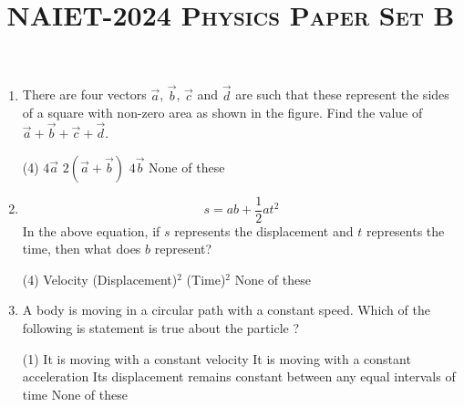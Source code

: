 \documentclass{article}
\title{\textsc{NAIET-2024 Physics Paper Set B}}
\date{}
\renewcommand{\ans}{\quad}
\begin{document}
\maketitle
\begin{enumerate}
    \item There are four vectors $\vec{a}$, $\vec{b}$, $\vec{c}$ and $\vec{d}$ are such that these represent the sides of a square with non-zero area as shown in the figure. Find the value of $\vec{a}+\vec{b}+\vec{c}+\vec{d}$.
        \begin{center}
        \end{center}
        \begin{tasks}(4)
            \task $4\vec{a}$
            \task $2\left(\vec{a}+\vec{b}\right)$
            \task $4\vec{b}$
            \task None of these \ans
        \end{tasks}

    \item \[ s = ab + \dfrac{1}{2}at^2 \]
        In the above equation, if $s$ represents the displacement and $t$ represents the time, then what does $b$ represent?
        \begin{tasks}(4)
            \task Velocity
            \task (Displacement)$^2$
            \task (Time)$^2$ \ans
            \task None of these
        \end{tasks} 

    \item A body is moving in a circular path with a constant speed. Which of the following is statement is true about the particle ?
    \begin{center}
    \end{center}
        \begin{tasks}(1)
            \task It is moving with a constant velocity
            \task It is moving with a constant acceleration
            \task Its displacement remains constant between any equal intervals of time 
            \task None of these \ans
        \end{tasks}


\end{enumerate}
\end{document}
